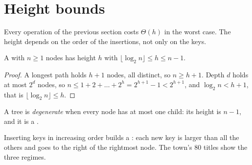 \section{Height bounds}\label{sec:b1:balanced-trees:height}

Every operation of the previous section costs $\Theta(h)$ in the worst case. The height depends on the order of the
insertions, not only on the keys.

\begin{proposition}\label{prop:b1:balanced-trees:height}
A  with $n \geq 1$ nodes has height $h$ with $\lfloor \log_2 n \rfloor \leq h \leq n - 1$.
\end{proposition}

\begin{proof}
A longest path holds $h + 1$ nodes, all distinct, so $n \geq h + 1$. Depth $d$ holds at most $2^d$ nodes, so $n \leq 1 +
2 + \dots + 2^h = 2^{h+1} - 1 < 2^{h+1}$, and $\log_2 n < h + 1$, that is $\lfloor \log_2 n \rfloor \leq h$.
\end{proof}

\begin{definition}\label{def:b1:balanced-trees:degenerate}
A tree is \emph{degenerate} when every node has at most one child: its height is $n - 1$, and it
is a .
\end{definition}

Inserting keys in increasing order builds a : each new key is larger than all the others and goes to the
right of the rightmost node. The town's 80 titles show the three regimes.

\label{out:b1:balanced-trees:heights}

